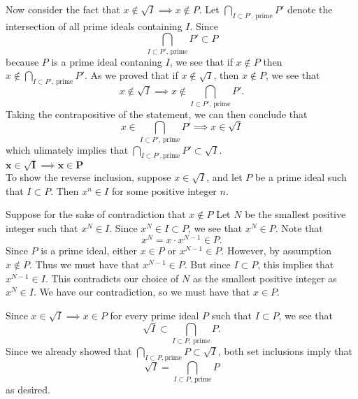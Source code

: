 \begin{prf}
\begin{enumerate}
    
            Now consider the fact that $x \not\in \sqrt{I} \implies x
            \not\in P$. Let $\displaystyle \bigcap_{I \subset P' \text{, prime}}P'$
            denote the intersection of all prime ideals containing $I$. Since 
            \[
                \bigcap_{I \subset P' \text{, prime}}P' \subset P    
            \] 
            because $P$ is a prime ideal contaning $I$, we see that if $x \not\in P$ then $\displaystyle x \not\in \bigcap_{I
            \subset P' \text{, prime}}P'$. As we proved that if $x \not\in
            \sqrt{I}$, then $x \not\in P$, we see that 
            \[
                x \not\in \sqrt{I} \implies x \not\in \bigcap_{I \subset P' \text{, prime}}P'.
            \]
            Taking the contrapositive of the statement, we can then conclude
            that 
            \[
                x \in \bigcap_{I \subset P' \text{, prime}}P' \implies x \in \sqrt{I}
            \]
            which ulimately implies that $\displaystyle \bigcap_{I \subset P', \text{prime}}P'
            \subset \sqrt{I}$. 
            \\[1.2ex]
            \underline{$\bm{x \in \sqrt{I} \implies x \in P}$}\\[1.2ex]
            To show the reverse inclusion, suppose  $x \in \sqrt{I}$, and
            let $P$ be a prime ideal such that $I \subset P$. Then
            $x^n \in I$ for some positive integer $n$. 
    
            Suppose for the sake of contradiction that $x \not\in P$ Let $N$ be the
            smallest positive integer such that $x^N \in I$. 
            Since $x^N \in I \subset P$, we see that $x^N \in P$. Note
            that 
            \[
                x^N = x \cdot x^{N-1} \in P.            
            \]
            Since $P$ is a prime ideal, either $x \in P$ or $x^{N-1} \in
            P$. However, by assumption $x \not\in P$. Thus we must have
            that $x^{N-1} \in P$. But since $I \subset P$, this implies
            that $x^{N-1} \in I$. This contradicts our choice of $N$ as
            the smallest positive integer as $x^N \in I$. We have our
            contradiction, so we must have that $x \in P$. 
    
            Since $x \in \sqrt{I} \implies x \in P$  for every prime ideal
            $P$ such that $I \subset P$, we see that 
            \[
                \sqrt{I} \subset \bigcap_{I\subset P \text{, prime}} P.    
            \]
            Since we already showed that $\displaystyle \bigcap_{I\subset P, \text{
            prime}} P \subset \sqrt{I}$, both set inclusions imply  that 
            \[
                \sqrt{I} = \bigcap_{I\subset P \text{, prime}} P 
            \]
            as desired.
        \end{enumerate}
    \end{prf}


